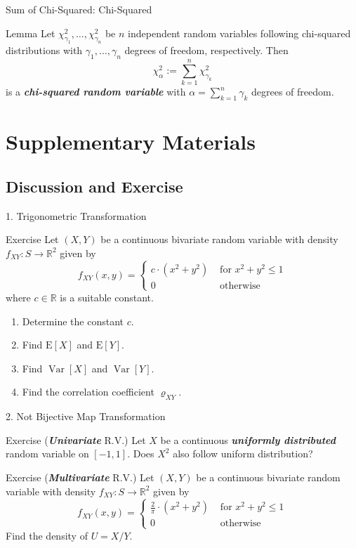 \documentclass{beamer}
\newcommand{\bb}[1]{\textcolor{antiquefuchsia}{\textbf{\textit{#1}}}}
\begin{document}
\begin{frame}{Sum of Chi-Squared: Chi-Squared}
\begin{block}{Lemma}
Let $\chi_{\gamma_{1}}^{2}, \ldots, \chi_{\gamma_{n}}^{2}$ be $n$ independent random variables following chi-squared distributions with $\gamma_{1}, \ldots, \gamma_{n}$ degrees of freedom, respectively. Then
$$
\chi_{\alpha}^{2}:=\sum_{k=1}^{n} \chi_{\gamma_{k}}^{2}
$$
is a \bb{chi-squared random variable} with $\alpha=\sum_{k=1}^{n} \gamma_{k}$ degrees of freedom.
\end{block}
\end{frame}

\section{Supplementary Materials}
\subsection{Discussion and Exercise}
\begin{frame}{1. Trigonometric Transformation}
\begin{block}{Exercise}
Let $(X, Y)$ be a continuous bivariate random variable with density $f_{X Y}: S \rightarrow \mathbb{R}^{2}$ given by
$$
f_{X Y}(x, y)= \begin{cases}c \cdot\left(x^{2}+y^{2}\right) & \text { for } x^{2}+y^{2} \leq 1 \\ 0 & \text { otherwise }\end{cases}
$$
where $c \in \mathbb{R}$ is a suitable constant.
\begin{enumerate}
\item Determine the constant $c$.
\item Find $\mathrm{E}[X]$ and $\mathrm{E}[Y]$.
\item Find $\operatorname{Var}[X]$ and $\operatorname{Var}[Y]$.
\item Find the correlation coefficient $\varrho_{X Y}$.
\end{enumerate}
\end{block}
\end{frame}

\begin{frame}{2. Not Bijective Map Transformation}
\begin{block}{Exercise}
(\bb{Univariate} R.V.) Let $X$ be a continuous \bb{uniformly distributed} random variable on $[-1,1]$. Does $X^2$ also follow uniform distribution?
\end{block}
\begin{block}{Exercise}
(\bb{Multivariate} R.V.) Let $(X, Y)$ be a continuous bivariate random variable with density $f_{X Y}: S \rightarrow \mathbb{R}^{2}$ given by
$$
f_{X Y}(x, y)= \begin{cases}\frac{2}{\pi} \cdot\left(x^{2}+y^{2}\right) & \text { for } x^{2}+y^{2} \leq 1 \\ 0 & \text { otherwise }\end{cases}
$$
Find the density of $U=X/Y$.
\end{block}
\end{frame}
\end{document}
